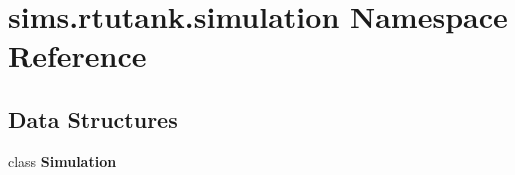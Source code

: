 \section{sims.\+rtutank.\+simulation Namespace Reference}
\label{namespacesims_1_1rtutank_1_1simulation}
\subsection*{Data Structures}
\begin{DoxyCompactItemize}
\item 
class {\bf Simulation}
\end{DoxyCompactItemize}
